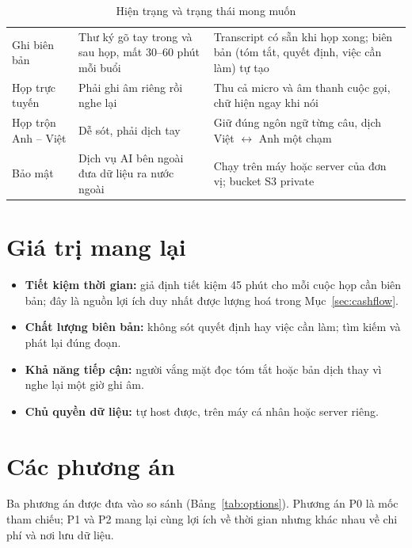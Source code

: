 \documentclass[12pt,a4paper]{report}
\begin{document}
\begin{table}[htbp]
  \centering
  \caption{Hiện trạng và trạng thái mong muốn}
  \label{tab:as-is-to-be}
  \begin{tabularx}{\linewidth}{@{}P{2.8cm}LL@{}}
    \toprule
     &  &  \\
    \midrule
    Ghi biên bản & Thư ký gõ tay trong và sau họp, mất 30--60 phút mỗi buổi
      & Transcript có sẵn khi họp xong; biên bản (tóm tắt, quyết định, việc cần làm) tự tạo \\
    Họp trực tuyến & Phải ghi âm riêng rồi nghe lại & Thu cả micro và âm thanh cuộc gọi, chữ hiện ngay khi nói \\
    Họp trộn Anh -- Việt & Dễ sót, phải dịch tay & Giữ đúng ngôn ngữ từng câu, dịch Việt $\leftrightarrow$ Anh một chạm \\
    Bảo mật & Dịch vụ AI bên ngoài đưa dữ liệu ra nước ngoài & Chạy trên máy hoặc server của đơn vị; bucket S3 private \\
    \bottomrule
  \end{tabularx}
\end{table}

\section{Giá trị mang lại}

\begin{itemize}
  \item \textbf{Tiết kiệm thời gian:} giả định tiết kiệm 45 phút cho mỗi cuộc họp cần biên bản; đây là nguồn
        lợi ích duy nhất được lượng hoá trong Mục~\ref{sec:cashflow}.
  \item \textbf{Chất lượng biên bản:} không sót quyết định hay việc cần làm; tìm kiếm và phát lại đúng đoạn.
  \item \textbf{Khả năng tiếp cận:} người vắng mặt đọc tóm tắt hoặc bản dịch thay vì nghe lại một giờ ghi âm.
  \item \textbf{Chủ quyền dữ liệu:} tự host được, trên máy cá nhân hoặc server riêng.
\end{itemize}

\section{Các phương án}

Ba phương án được đưa vào so sánh (Bảng~\ref{tab:options}). Phương án P0 là mốc tham chiếu; P1 và P2 mang lại
cùng lợi ích về thời gian nhưng khác nhau về chi phí và nơi lưu dữ liệu.
\end{document}
